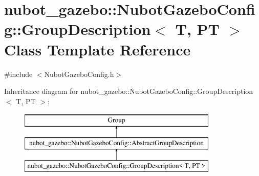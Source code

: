 \hypertarget{classnubot__gazebo_1_1NubotGazeboConfig_1_1GroupDescription}{\section{nubot\-\_\-gazebo\-:\-:Nubot\-Gazebo\-Config\-:\-:Group\-Description$<$ T, P\-T $>$ Class Template Reference}
\label{classnubot__gazebo_1_1NubotGazeboConfig_1_1GroupDescription}
}


{\ttfamily \#include $<$Nubot\-Gazebo\-Config.\-h$>$}

Inheritance diagram for nubot\-\_\-gazebo\-:\-:Nubot\-Gazebo\-Config\-:\-:Group\-Description$<$ T, P\-T $>$\-:\begin{figure}[H]
\begin{center}
\leavevmode
\includegraphics[height=3.000000cm]{classnubot__gazebo_1_1NubotGazeboConfig_1_1GroupDescription}
\end{center}
\end{figure}
